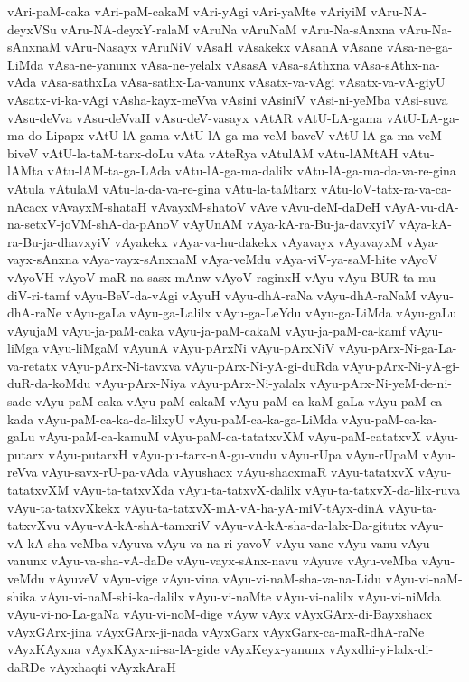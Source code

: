 {vAri-paM-caka
vAri-paM-cakaM
vAri-yAgi
vAri-yaMte
vAriyiM
vAru-NA-deyxVSu
vAru-NA-deyxY-ralaM
vAruNa
vAruNaM
vAru-Na-sAnxna
vAru-Na-sAnxnaM
vAru-Nasayx
vAruNiV
vAsaH
vAsakekx
vAsanA
vAsane
vAsa-ne-ga-LiMda
vAsa-ne-yanunx
vAsa-ne-yelalx
vAsasA
vAsa-sAthxna
vAsa-sAthx-na-vAda
vAsa-sathxLa
vAsa-sathx-La-vanunx
vAsatx-va-vAgi
vAsatx-va-vA-giyU
vAsatx-vi-ka-vAgi
vAsha-kayx-meVva
vAsini
vAsiniV
vAsi-ni-yeMba
vAsi-suva
vAsu-deVva
vAsu-deVvaH
vAsu-deV-vasayx
vAtAR
vAtU-LA-gama
vAtU-LA-ga-ma-do-Lipapx
vAtU-lA-gama
vAtU-lA-ga-ma-veM-baveV
vAtU-lA-ga-ma-veM-biveV
vAtU-la-taM-tarx-doLu
vAta
vAteRya
vAtulAM
vAtu-lAMtAH
vAtu-lAMta
vAtu-lAM-ta-ga-LAda
vAtu-lA-ga-ma-dalilx
vAtu-lA-ga-ma-da-va-re-gina
vAtula
vAtulaM
vAtu-la-da-va-re-gina
vAtu-la-taMtarx
vAtu-loV-tatx-ra-va-ca-nAcacx
vAvayxM-shataH
vAvayxM-shatoV
vAve
vAvu-deM-daDeH
vAyA-vu-dA-na-setxV-joVM-shA-da-pAnoV
vAyUnAM
vAya-kA-ra-Bu-ja-davxyiV
vAya-kA-ra-Bu-ja-dhavxyiV
vAyakekx
vAya-va-hu-dakekx
vAyavayx
vAyavayxM
vAya-vayx-sAnxna
vAya-vayx-sAnxnaM
vAya-veMdu
vAya-viV-ya-saM-hite
vAyoV
vAyoVH
vAyoV-maR-na-sasx-mAnw
vAyoV-raginxH
vAyu
vAyu-BUR-ta-mu-diV-ri-tamf
vAyu-BeV-da-vAgi
vAyuH
vAyu-dhA-raNa
vAyu-dhA-raNaM
vAyu-dhA-raNe
vAyu-gaLa
vAyu-ga-Lalilx
vAyu-ga-LeYdu
vAyu-ga-LiMda
vAyu-gaLu
vAyujaM
vAyu-ja-paM-caka
vAyu-ja-paM-cakaM
vAyu-ja-paM-ca-kamf
vAyu-liMga
vAyu-liMgaM
vAyunA
vAyu-pArxNi
vAyu-pArxNiV
vAyu-pArx-Ni-ga-La-va-retatx
vAyu-pArx-Ni-tavxva
vAyu-pArx-Ni-yA-gi-duRda
vAyu-pArx-Ni-yA-gi-duR-da-koMdu
vAyu-pArx-Niya
vAyu-pArx-Ni-yalalx
vAyu-pArx-Ni-yeM-de-ni-sade
vAyu-paM-caka
vAyu-paM-cakaM
vAyu-paM-ca-kaM-gaLa
vAyu-paM-ca-kada
vAyu-paM-ca-ka-da-lilxyU
vAyu-paM-ca-ka-ga-LiMda
vAyu-paM-ca-ka-gaLu
vAyu-paM-ca-kamuM
vAyu-paM-ca-tatatxvXM
vAyu-paM-catatxvX
vAyu-putarx
vAyu-putarxH
vAyu-pu-tarx-nA-gu-vudu
vAyu-rUpa
vAyu-rUpaM
vAyu-reVva
vAyu-savx-rU-pa-vAda
vAyushacx
vAyu-shacxmaR
vAyu-tatatxvX
vAyu-tatatxvXM
vAyu-ta-tatxvXda
vAyu-ta-tatxvX-dalilx
vAyu-ta-tatxvX-da-lilx-ruva
vAyu-ta-tatxvXkekx
vAyu-ta-tatxvX-mA-vA-ha-yA-miV-tAyx-dinA
vAyu-ta-tatxvXvu
vAyu-vA-kA-shA-tamxriV
vAyu-vA-kA-sha-da-lalx-Da-gitutx
vAyu-vA-kA-sha-veMba
vAyuva
vAyu-va-na-ri-yavoV
vAyu-vane
vAyu-vanu
vAyu-vanunx
vAyu-va-sha-vA-daDe
vAyu-vayx-sAnx-navu
vAyuve
vAyu-veMba
vAyu-veMdu
vAyuveV
vAyu-vige
vAyu-vina
vAyu-vi-naM-sha-va-na-Lidu
vAyu-vi-naM-shika
vAyu-vi-naM-shi-ka-dalilx
vAyu-vi-naMte
vAyu-vi-nalilx
vAyu-vi-niMda
vAyu-vi-no-La-gaNa
vAyu-vi-noM-dige
vAyw
vAyx
vAyxGArx-di-Bayxshacx
vAyxGArx-jina
vAyxGArx-ji-nada
vAyxGarx
vAyxGarx-ca-maR-dhA-raNe
vAyxKAyxna
vAyxKAyx-ni-sa-lA-gide
vAyxKeyx-yanunx
vAyxdhi-yi-lalx-di-daRDe
vAyxhaqti
vAyxkAraH
}
